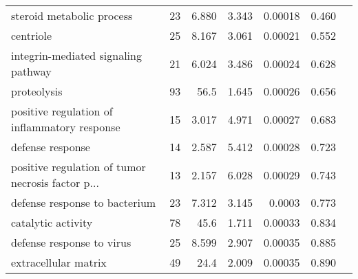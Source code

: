 \begin{longtable}{|l|r|r|r|r|r|}
                         steroid metabolic process &                      23 &                   6.880 &      3.343 &              0.00018 &                       0.460~~ \\
                                         centriole &                      25 &                   8.167 &      3.061 &              0.00021 &                       0.552~~ \\
               integrin-mediated signaling pathway &                      21 &                   6.024 &      3.486 &              0.00024 &                       0.628~~ \\
                                       proteolysis &                      93 &                    56.5 &      1.645 &              0.00026 &                       0.656~~ \\
      positive regulation of inflammatory response &                      15 &                   3.017 &      4.971 &              0.00027 &                       0.683~~ \\
                                  defense response &                      14 &                   2.587 &      5.412 &              0.00028 &                       0.723~~ \\
 positive regulation of tumor necrosis factor p... &                      13 &                   2.157 &      6.028 &              0.00029 &                       0.743~~ \\
                     defense response to bacterium &                      23 &                   7.312 &      3.145 &               0.0003 &                       0.773~~ \\
                                catalytic activity &                      78 &                    45.6 &      1.711 &              0.00033 &                       0.834~~ \\
                         defense response to virus &                      25 &                   8.599 &      2.907 &              0.00035 &                       0.885~~ \\
                              extracellular matrix &                      49 &                    24.4 &      2.009 &              0.00035 &                       0.890~~ \\
\end{longtable}
